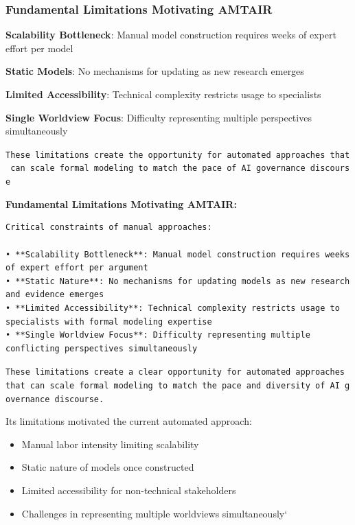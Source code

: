 \documentclass[
  11pt,
  letterpaper,
]{book}
\providecommand{\tightlist}{%
  \setlength{\itemsep}{0pt}\setlength{\parskip}{0pt}}
\begin{document}
\subsubsection{Fundamental Limitations Motivating
AMTAIR}\label{sec-mtair-limitations}

\textbf{Scalability Bottleneck}: Manual model construction requires
weeks of expert effort per model

\textbf{Static Models}: No mechanisms for updating as new research
emerges

\textbf{Limited Accessibility}: Technical complexity restricts usage to
specialists

\textbf{Single Worldview Focus}: Difficulty representing multiple
perspectives simultaneously

\texttt{These\ limitations\ create\ the\ opportunity\ for\ automated\ approaches\ that\ can\ scale\ formal\ modeling\ to\ match\ the\ pace\ of\ AI\ governance\ discourse}

\textbf{Fundamental Limitations Motivating AMTAIR:}

\begin{verbatim}
Critical constraints of manual approaches:

• **Scalability Bottleneck**: Manual model construction requires weeks of expert effort per argument
• **Static Nature**: No mechanisms for updating models as new research and evidence emerges  
• **Limited Accessibility**: Technical complexity restricts usage to specialists with formal modeling expertise
• **Single Worldview Focus**: Difficulty representing multiple conflicting perspectives simultaneously
\end{verbatim}

\texttt{These\ limitations\ create\ a\ clear\ opportunity\ for\ automated\ approaches\ that\ can\ scale\ formal\ modeling\ to\ match\ the\ pace\ and\ diversity\ of\ AI\ governance\ discourse.}

Its limitations motivated the current automated approach:

\begin{itemize}
\tightlist
\item
  Manual labor intensity limiting scalability
\item
  Static nature of models once constructed
\item
  Limited accessibility for non-technical stakeholders
\item
  Challenges in representing multiple worldviews simultaneously`
\end{itemize}
\end{document}
